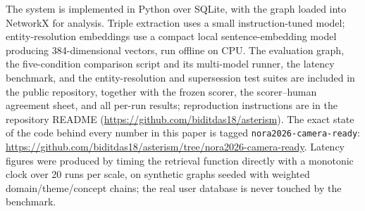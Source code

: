\documentclass[11pt]{article}
\newif\ifanon
\begin{document}
The system is implemented in Python over SQLite, with the graph loaded into NetworkX \citep{hagberg2008exploring} for analysis. Triple extraction uses a small instruction-tuned model; entity-resolution embeddings use a compact local sentence-embedding model \citep{xiao2023cpack} producing 384-dimensional vectors, run offline on CPU. The evaluation graph, the five-condition comparison script and its multi-model runner, the latency benchmark, and the entity-resolution and supersession test suites are included in the public repository, together with the frozen scorer, the scorer--human agreement sheet, and all per-run results; reproduction instructions are in the repository README\ifanon{} (anonymized repository: \url{https://anonymous.4open.science/r/asterism-7023/README.md})\else{} (\url{https://github.com/biditdas18/asterism}). The exact state of the code behind every number in this paper is tagged \texttt{nora2026-camera-ready}: \url{https://github.com/biditdas18/asterism/tree/nora2026-camera-ready}\fi. Latency figures were produced by timing the retrieval function directly with a monotonic clock over 20 runs per scale, on synthetic graphs seeded with weighted domain/theme/concept chains; the real user database is never touched by the benchmark.
\end{document}
